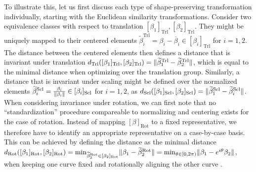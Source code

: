 To illustrate this, let us first discuss each type of shape-preserving transformation individually, starting with the Euclidean similarity transformations.
Consider two equivalence classes with respect to translation $[\beta_1]_\text{Trl}, [\beta_2]_\text{Trl}$.
They might be uniquely mapped to their centered elements $\widetilde\beta^\text{Trl}_i = \beta_i - \overline{\beta}_i \in [\beta_i]_\text{Trl}$ for $i=1,2$.
The distance between the centered elements then defines a distance that is invariant under translation $d_\text{Trl}([\beta_1]_\text{Trl}, [\beta_2]_\text{Trl}) = \lVert\widetilde\beta^\text{Trl}_1 - \widetilde\beta^\text{Trl}_2\rVert$, which is equal to the minimal distance when optimizing over the translation group.
Similarly, a distance that is invariant under scaling might be defined over the normalized elements $\widetilde\beta^\text{Scl}_i = \frac{\beta_i}{\lVert\beta_i\rVert} \in [\beta_i]_\text{Scl}$ for $i = 1,2$, as $d_\text{Scl}([\beta_1]_\text{Scl}, [\beta_2]_\text{Scl}) = \lVert\widetilde\beta^\text{Scl}_1 - \widetilde\beta^\text{Scl}_i\rVert$.
When considering invariance under rotation, we can first note that no \enquote{standardization} procedure compareable to normalizing and centering exists for the case of rotation.
Instead of mapping $[\beta]_\text{Rot}$ to a fixed representative, we therefore have to identify an appropriate representative on a case-by-case basis.
This can be achieved by defining the distance as the minimal distance $d_\text{Rot}([\beta_1]_\text{Rot}, [\beta_2]_\text{Rot}) = \min_{\widetilde\beta^\text{Rot}_2 \in [\beta_2]_\text{Rot}} \lVert\beta_1 - \widetilde\beta^\text{Rot}_2\rVert = \min_{\theta \in [0,2\pi)} \lVert\beta_1 - e^{i\theta}\beta_2\rVert$, when keeping one curve fixed and rotationally aligning the other curve \parencite[see e.g][]{Stoecker2021}.


